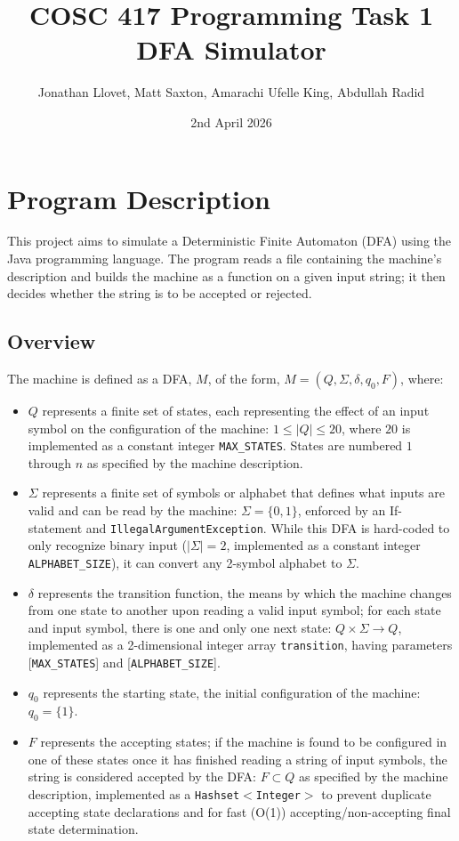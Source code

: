 \documentclass[11pt]{article}
\title{COSC 417 Programming Task 1 \\ DFA Simulator}
\author{Jonathan Llovet, Matt Saxton, Amarachi Ufelle King, Abdullah Radid}
\date{2nd April 2026}
\begin{document}
\maketitle

\section*{Program Description}

This project aims to simulate a Deterministic Finite Automaton (DFA) using the Java programming language. The program reads a file containing the machine's description and builds the machine as a function on a given input string; it then decides whether the string is to be accepted or rejected.

\subsection*{Overview}

The machine is defined as a DFA, $M$, of the form, $M = (Q, \Sigma, \delta, q_0, F)$, where:
\begin{itemize}
    \item $Q$ represents a finite set of states, each representing the effect of an input symbol on the configuration of the machine:
    $1 \leq |Q| \leq 20$, where $20$ is implemented as a constant integer \texttt{MAX\_STATES}. States are numbered $1$ through $n$ as specified by the machine description.
    \item $\Sigma$ represents a finite set of symbols or alphabet that defines what inputs are valid and can be read by the machine: $\Sigma = \{0, 1\}$, enforced by an If-statement and \texttt{IllegalArgumentException}. While this DFA is hard-coded to only recognize binary input ($|\Sigma| = 2$, implemented as a constant integer \texttt{ALPHABET\_SIZE}), it can convert any 2-symbol alphabet to $\Sigma$.
    \item $\delta$ represents the transition function, the means by which the machine changes from one state to another upon reading a valid input symbol; for each state and input symbol, there is one and only one next state: $Q \times \Sigma \rightarrow Q$, implemented as a 2-dimensional integer array \texttt{transition}, having parameters [\texttt{MAX\_STATES}] and [\texttt{ALPHABET\_SIZE}].
    \item $q_0$ represents the starting state, the initial configuration of the machine: $q_0 = \{1\}$.
    \item $F$ represents the accepting states; if the machine is found to be configured in one of these states once it has finished reading a string of input symbols, the string is considered accepted by the DFA: $F \subset Q$ as specified by the machine description, implemented as a \texttt{Hashset$<$Integer$>$} to prevent duplicate accepting state declarations and for fast (O(1)) accepting/non-accepting final state determination.
\end{itemize}
\end{document}
